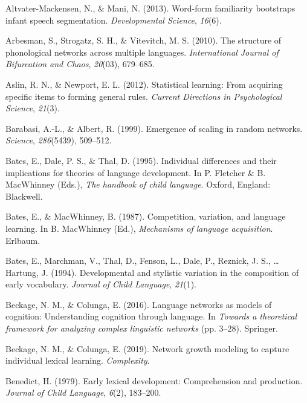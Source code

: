 \documentclass[english,,man,floatsintext]{apa6}
\begin{document}
\hypertarget{refs}{}
\leavevmode\hypertarget{ref-altvater2013}{}%
Altvater-Mackensen, N., \& Mani, N. (2013). Word-form familiarity bootstraps infant speech segmentation. \emph{Developmental Science}, \emph{16}(6).

\leavevmode\hypertarget{ref-arbesman2010}{}%
Arbesman, S., Strogatz, S. H., \& Vitevitch, M. S. (2010). The structure of phonological networks across multiple languages. \emph{International Journal of Bifurcation and Chaos}, \emph{20}(03), 679--685.

\leavevmode\hypertarget{ref-aslin2012}{}%
Aslin, R. N., \& Newport, E. L. (2012). Statistical learning: From acquiring specific items to forming general rules. \emph{Current Directions in Psychological Science}, \emph{21}(3).

\leavevmode\hypertarget{ref-barabasi99}{}%
Barabasi, A.-L., \& Albert, R. (1999). Emergence of scaling in random networks. \emph{Science}, \emph{286}(5439), 509--512.

\leavevmode\hypertarget{ref-bates1995}{}%
Bates, E., Dale, P. S., \& Thal, D. (1995). Individual differences and their implications for theories of language development. In P. Fletcher \& B. MacWhinney (Eds.), \emph{The handbook of child language}. Oxford, England: Blackwell.

\leavevmode\hypertarget{ref-bates1987}{}%
Bates, E., \& MacWhinney, B. (1987). Competition, variation, and language learning. In B. MacWhinney (Ed.), \emph{Mechanisms of language acquisition}. Erlbaum.

\leavevmode\hypertarget{ref-bates1994}{}%
Bates, E., Marchman, V., Thal, D., Fenson, L., Dale, P., Reznick, J. S., \ldots{} Hartung, J. (1994). Developmental and stylistic variation in the composition of early vocabulary. \emph{Journal of Child Language}, \emph{21}(1).

\leavevmode\hypertarget{ref-beckage2016}{}%
Beckage, N. M., \& Colunga, E. (2016). Language networks as models of cognition: Understanding cognition through language. In \emph{Towards a theoretical framework for analyzing complex linguistic networks} (pp. 3--28). Springer.

\leavevmode\hypertarget{ref-beckage2019}{}%
Beckage, N. M., \& Colunga, E. (2019). Network growth modeling to capture individual lexical learning. \emph{Complexity}.

\leavevmode\hypertarget{ref-benedict1979}{}%
Benedict, H. (1979). Early lexical development: Comprehension and production. \emph{Journal of Child Language}, \emph{6}(2), 183--200.
\end{document}
